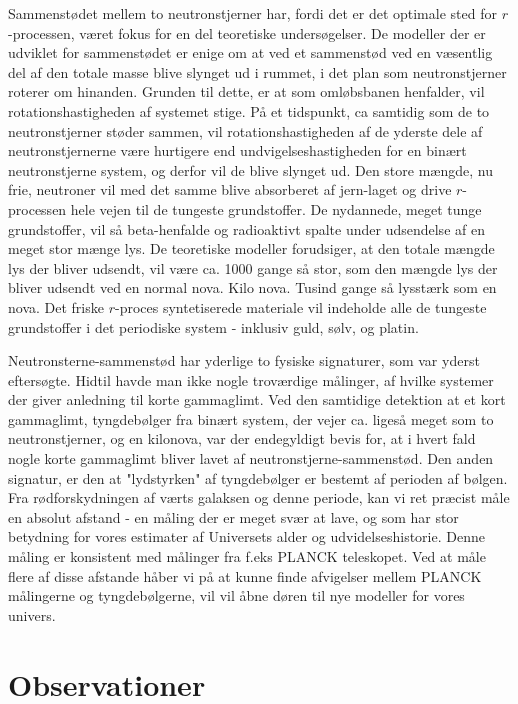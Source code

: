 \documentclass[twocolumn]{article}
\begin{document}
Sammenstødet mellem to neutronstjerner har, fordi det er det optimale sted for $r$-processen, været fokus for en del teoretiske undersøgelser. De modeller der er udviklet for sammenstødet er enige om at ved et sammenstød ved en væsentlig del af den totale masse blive slynget ud i rummet, i det plan som neutronstjerner roterer om hinanden. Grunden til dette, er at som omløbsbanen henfalder, vil rotationshastigheden af systemet stige. På et tidspunkt, ca samtidig som de to neutronstjerner støder sammen, vil rotationshastigheden af de yderste dele af neutronstjernerne være hurtigere end undvigelseshastigheden for en binært neutronstjerne system, og derfor vil de blive slynget ud. Den store mængde, nu frie, neutroner vil med det samme blive absorberet af jern-laget og drive $r$-processen hele vejen til de tungeste grundstoffer. De nydannede, meget tunge grundstoffer, vil så beta-henfalde og radioaktivt spalte under udsendelse af en meget stor mænge lys. De teoretiske modeller forudsiger, at den totale mængde lys der bliver udsendt, vil være ca. 1000 gange så stor, som den mængde lys der bliver udsendt ved en normal nova. Kilo nova. Tusind gange så lysstærk som en nova. Det friske $r$-proces syntetiserede materiale vil indeholde alle de tungeste grundstoffer i det periodiske system - inklusiv guld, sølv, og platin.

Neutronsterne-sammenstød har yderlige to fysiske signaturer, som var yderst eftersøgte. Hidtil havde man ikke nogle troværdige målinger, af hvilke systemer der giver anledning til korte gammaglimt. Ved den samtidige detektion at et kort gammaglimt, tyngdebølger fra binært system, der vejer ca. ligeså meget som to neutronstjerner, og en kilonova, var der endegyldigt bevis for, at i hvert fald nogle korte gammaglimt bliver lavet af neutronstjerne-sammenstød. Den anden signatur, er den at "lydstyrken" af tyngdebølger er bestemt af perioden af bølgen. Fra rødforskydningen af værts galaksen og denne periode, kan vi ret præcist måle en absolut afstand - en måling der er meget svær at lave, og som har stor betydning for vores estimater af Universets alder og udvidelseshistorie. Denne måling er konsistent med målinger fra f.eks PLANCK teleskopet. Ved at måle flere af disse afstande håber vi på at kunne finde afvigelser mellem PLANCK målingerne og tyngdebølgerne, vil vil åbne døren til nye modeller for vores univers. 


\section{Observationer}\label{obs}
\end{document}
